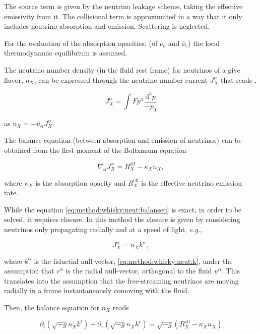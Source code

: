\documentclass[11pt,a4paper,headinclude=true,DIV=14,BCOR=8mm,chapterprefix,listof=totoc,twoside,openright,abstracton]{scrbook}
\newcommand{\dd}{\text{d}}
\begin{document}
The source term is given by the neutrino leakage scheme, taking the effective emissivity from it.
The collisional term is approximated in a way that it only includes neutrino absorption and emission. Scattering is neglected.

For the evaluation of the absorption opacities, (of $\nu_{e}$ and $\bar{\nu}_{e}$) the local thermodynamic equilibrium is assumed.

The neutrino number density (in the fluid rest frame) for neutrinos of a give flavor, $n_X$, can be expressed through the neutrino number current $J_{X}^{\alpha}$ that reads \cite{Lindquist:1966},

\begin{equation}
    J_{X}^{\alpha} = \int F p^{\alpha} \frac{\dd^3 p}{-p_0}
\end{equation}

as $n_X = - u_{\alpha} J_{X}^{\alpha}$.

The balance equation (between absorption and emission of neutrinos) can be obtained from the 
first moment of the Boltzmann equation \cite{Thorne:1981,Shibata:2011kx}

\begin{equation}
    \label{eq:method:whisky:neut:balanseq}
    \nabla_{\alpha}J_{X}^{\alpha} = R_{X}^{\text{eff}} - \kappa_X n_X,
\end{equation}

where $\kappa_X$ is the absorption opacity and $R_X^{\text{eff}}$ is the effective neutrino emission rate.

While the equation \eqref{eq:method:whisky:neut:balanseq} is exact, in order to be solved, it requires closure. 
In this method the closure is given by considering neutrinos only propagating radially and at a speed of light, \textit{e.g.,}

\begin{equation}
    J_{X}^{\alpha} = n_X k^{\alpha},
\end{equation}

where $k^{\alpha}$ is the fiductial null vector, \eqref{eq:method:whisky:neut:k}, under the assumption that $r^{\alpha}$ is the radial null-vector, orthogonal to the fluid $u^{\alpha}$.
This translates into the assumption that the free-streaming neutrinos are moving radially in a frame instantaneously comoving with the fluid.

Then, the balance equation for $n_X$ reads

\begin{equation}
    \label{eq:mehtod:whisky:neut:balanseq2}
    \partial_t(\sqrt{-g}n_X k^t) + \partial_r(\sqrt{-g}n_X k^r) = \sqrt{-g}(R^{\text{eff}}_{X} - \kappa_X n_X)
\end{equation}
\end{document}
